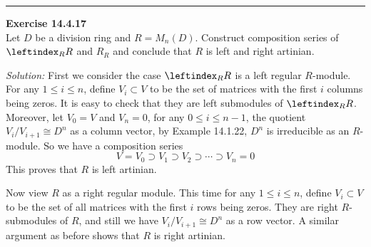 \documentclass[a4paper, 12pt]{article}
\newenvironment{problem}[2][Exercise]
    { \begin{mdframed}[backgroundcolor=gray!20] \textbf{#1 #2} \\}
    {  \end{mdframed}}
\newenvironment{solution}
    {\textit{Solution:}}
    {}
\begin{document}
\noindent\rule{7in}{2.8pt}
\begin{problem}{14.4.17}
Let \(D\) be a division ring and \(R=M_n(D)\). Construct composition series of \(\leftindex_R R\) and \(R_R\) and conclude that \(R\) is left and right artinian.
\end{problem}
\begin{solution}
First we consider the case \(\leftindex_R R\) is a left regular \(R\)-module. For any \(1\leq i\leq n\), define \(V_i\subset V\) to be the set of matrices with the first \(i\) columns being zeros. It is easy to check that they are 
left submodules of \(\leftindex_R R\). Moreover, let \(V_0=V\) and \(V_n=0\), for any \(0\leq i\leq n-1\), the quotient \(V_i/V_{i+1}\cong D^n\) as a column vector, by Example 14.1.22, \(D^n\) is irreducible as an \(R\)-module. So we have a composition 
series 
\[V=V_0\supset V_1\supset V_2\supset \cdots\supset V_n=0\]
This proves that \(R\) is left artinian. 

Now view \(R\) as a right regular module. This time for any \(1\leq i\leq n\), define \(V_i\subset V\) to be the set of all matrices with the first \(i\) rows being zeros. They are right \(R\)-submodules of \(R\), and still we have \(V_i/V_{i+1}\cong D^n\) as a row vector. A 
similar argument as before shows that \(R\) is right artinian.
\end{solution}
\end{document}
